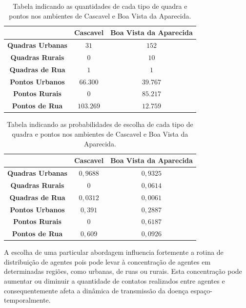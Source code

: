 \begin{table}[H]
\centering
\begin{tabular}{c|c|c}
				& \textbf{Cascavel}		& \textbf{Boa Vista da Aparecida} 	\\ \hline
 \textbf{Quadras Urbanas}	& $31$				& $152$	  				\\
 \textbf{Quadras Rurais} 	& $0$				& $10$	  				\\
 \textbf{Quadras de Rua}	& $1$				& $1$	  				\\ \hline
 \textbf{Pontos Urbanos}	& $66.300$			& $39.767$	  			\\ 
 \textbf{Pontos Rurais}		& $0$				& $85.217$  				\\
 \textbf{Pontos de Rua}		& $103.269$			& $12.759$  				\\
 \end{tabular}
\caption{Tabela indicando as quantidades de cada tipo de quadra e pontos nos ambientes de Cascavel e Boa Vista da Aparecida. }
\label{tab:quant_quadras_pontos}
\end{table}

\begin{table}[H]
\centering
\begin{tabular}{c|c|c}
				& \textbf{Cascavel}		& \textbf{Boa Vista da Aparecida} 	\\ \hline
 \textbf{Quadras Urbanas}	& $0,9688$			& $0,9325$	  			\\
 \textbf{Quadras Rurais} 	& $0$				& $0,0614$	  			\\
 \textbf{Quadras de Rua}	& $0,0312$			& $0,0061$	  			\\ \hline
 \textbf{Pontos Urbanos}	& $0,391$			& $0,2887$	  			\\ 
 \textbf{Pontos Rurais}		& $0$				& $0,6187$  				\\
 \textbf{Pontos de Rua}		& $0,609$			& $0,0926$  				\\
 \end{tabular}
\caption{Tabela indicando as probabilidades de escolha de cada tipo de quadra e pontos nos ambientes de Cascavel e Boa Vista da Aparecida. }
\label{tab:perc_quadras_pontos}
\end{table}

A escolha de uma particular abordagem influencia fortemente a rotina de distribuição de agentes pois pode levar à concentração de agentes em determinadas regiões, como urbanas, de ruas ou rurais. Esta concentração pode aumentar ou diminuir a quantidade de contatos realizados entre agentes e consequentemente afeta a dinâmica de transmissão da doença espaço-temporalmente. 

